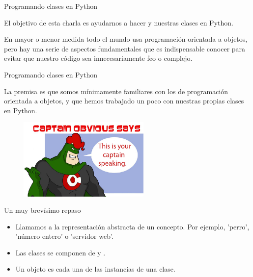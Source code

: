 \begin{frame}{Programando clases en Python}
  \begin{block}{}
    \Large
    \centering
    El objetivo de esta charla es ayudarnos a hacer
     y  nuestras clases en
    Python.
  \end{block}

  \begin{justify}
    En mayor o menor medida todo el mundo usa programación orientada a
    objetos, pero hay una serie de aspectos fundamentales que es
    indispensable conocer para evitar que nuestro código sea
    innecesariamente feo o complejo.
  \end{justify}
\end{frame}

\begin{frame}{Programando clases en Python}
  \begin{alertblock}{}
    \small
    \centering
    La premisa es que somos mínimamente familiares con los
     de programación orientada a objetos,
    y que hemos trabajado un poco con nuestras propias clases en
    Python.
  \end{alertblock}

  \begin{figure}
    \centering
    \includegraphics[height=4cm]{pics/captain-obvious.jpg}
  \end{figure}
\end{frame}

\begin{frame}{Un muy brevísimo repaso}
  \begin{itemize}
    \item Llamamos  a la representación abstracta de un
      concepto. Por ejemplo, 'perro', 'número entero' o 'servidor web'.
    \item Las clases se componen de  y
      .
    \item Un objeto es cada una de las instancias de una clase.
  \end{itemize}
\end{frame}

